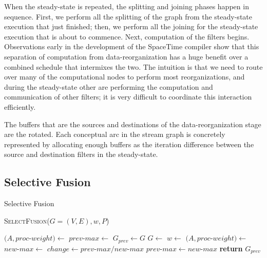 When the steady-state is repeated, the splitting and joining phases
happen in sequence.  First, we perform all the splitting of the graph
from the steady-state execution that just finished; then, we perform
all the joining for the steady-state execution that is about to
commence. Next, computation of the filters begins.  Observations early
in the development of the SpaceTime compiler show that this separation
of computation from data-reorganization has a huge benefit over a
combined schedule that intermixes the two.  The intuition is that we
need to route over many of the computational nodes to perform most
reorganizations, and during the steady-state other are performing the
computation and communication of other filters; it is very difficult to
coordinate this interaction efficiently.

The buffers that are the sources and destinations of the
data-reorganization stage are the rotated.  Each conceptual arc in the
stream graph is concretely represented by allocating enough buffers as
the iteration difference between the source and destination filters in
the steady-state.

\subsection{Selective Fusion}
\begin{algorithm}
\caption{Selective Fusion} \label {alg:select_fus}
\textsc{SelectFusion}($G = (V, E), w, P$)
\begin{algorithmic}[1]
\State $(A, proc$-$weight) \gets $  
\State $prev$-$max \gets $ 
\Repeat
	\State $G_{prev} \gets G$
	\State $G \gets $ 
	\State $w \gets $ 
	\State $(A, proc$-$weight) \gets $ 
	\State $new$-$max \gets $ 
	\State $change \gets prev$-$max / new$-$max $
	\State $prev$-$max \gets new$-$max$
\State \textbf{return} $G_{prev}$
\end{algorithmic}
\end{algorithm}



